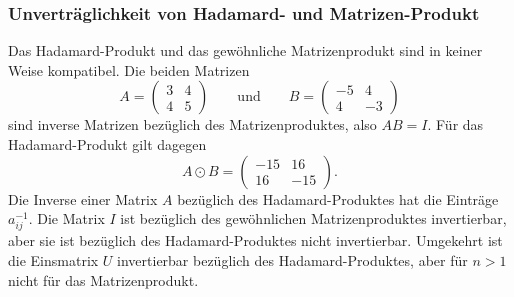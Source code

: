 \subsubsection{Unverträglichkeit von Hadamard- und Matrizen-Produkt}
Das Hadamard-Produkt und das gewöhnliche Matrizenprodukt sind
in keiner Weise kompatibel.
Die beiden Matrizen 
\[
A=\begin{pmatrix}3&4\\4&5\end{pmatrix}
\qquad\text{und}\qquad
B=\begin{pmatrix}-5&4\\4&-3\end{pmatrix}
\]
sind inverse Matrizen bezüglich des Matrizenproduktes, also
$AB=I$.
Für das Hadamard-Produkt gilt dagegen
\[
A\odot B
=
\begin{pmatrix}
-15& 16\\
 16&-15
\end{pmatrix}.
\]
Die Inverse einer Matrix $A$ bezüglich des Hadamard-Produktes hat
die Einträge $a_{i\!j}^{-1}$.
Die Matrix $I$ ist bezüglich des gewöhnlichen Matrizenproduktes
invertierbar, aber sie ist bezüglich des Hadamard-Produktes nicht
invertierbar.
Umgekehrt ist die Einsmatrix $U$ invertierbar bezüglich des
Hadamard-Produktes, aber für $n>1$ nicht für das Matrizenprodukt.

